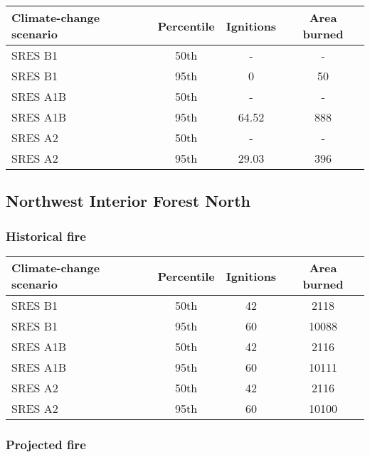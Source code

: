 \documentclass{article}\usepackage[]{graphicx}\usepackage[]{color}
\newcommand{\headcol}{\rowcolor{tableheadcolor}}
\begin{document}
\begin{table}[ht]
\centering
\begin{tabular}{lccc}
  \headcol 
 \toprule
Climate-change scenario & Percentile & Ignitions & Area burned \\ 
  \midrule
SRES B1 & 50th & - & - \\ 
  SRES B1 & 95th & 0 & 50 \\ 
  SRES A1B & 50th & - & - \\ 
  SRES A1B & 95th & 64.52 & 888 \\ 
  SRES A2 & 50th & - & - \\ 
  SRES A2 & 95th & 29.03 & 396 \\ 
   \bottomrule
\end{tabular}
\end{table}


\newpage
\pagebreak
\subsection{Northwest Interior Forest North}
\subsubsection{Historical fire}

\begin{table}[ht]
\centering
\begin{tabular}{lccc}
  \headcol 
 \toprule
Climate-change scenario & Percentile & Ignitions & Area burned \\ 
  \midrule
SRES B1 & 50th & 42 & 2118 \\ 
  SRES B1 & 95th & 60 & 10088 \\ 
  SRES A1B & 50th & 42 & 2116 \\ 
  SRES A1B & 95th & 60 & 10111 \\ 
  SRES A2 & 50th & 42 & 2116 \\ 
  SRES A2 & 95th & 60 & 10100 \\ 
   \bottomrule
\end{tabular}
\end{table}


\subsubsection{Projected fire}
\end{document}
